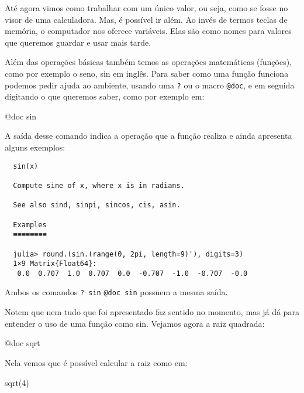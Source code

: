 \documentclass[
  letterpaper,
  DIV=11,
  numbers=noendperiod]{scrreprt}
\newenvironment{Shaded}{\begin{snugshade}}{\end{snugshade}}
\newcommand{\FloatTok}[1]{\textcolor[rgb]{0.68,0.00,0.00}{#1}}
\newcommand{\FunctionTok}[1]{\textcolor[rgb]{0.28,0.35,0.67}{#1}}
\newcommand{\NormalTok}[1]{\textcolor[rgb]{0.00,0.23,0.31}{#1}}
\newcommand{\PreprocessorTok}[1]{\textcolor[rgb]{0.68,0.00,0.00}{#1}}
\begin{document}
Até agora vimos como trabalhar com um único valor, ou seja, como se
fosse no visor de uma calculadora. Mas, é possível ir além. Ao invés de
termos teclas de memória, o computador nos oferece variáveis. Elas são
como nomes para valores que queremos guardar e usar mais tarde.

Além das operações básicas também temos as operações matemáticas
(funções), como por exemplo o seno, sin em inglês. Para saber como uma
função funciona podemos pedir ajuda ao ambiente, usando uma \texttt{?}
ou o macro \texttt{@doc}, e em seguida digitando o que queremos saber,
como por exemplo em:

\begin{Shaded}
\begin{Highlighting}[]
\PreprocessorTok{@doc}\NormalTok{ sin}
\end{Highlighting}
\end{Shaded}

A saída desse comando indica a operação que a função realiza e ainda
apresenta alguns exemplos:

\begin{verbatim}
  sin(x)

  Compute sine of x, where x is in radians.

  See also sind, sinpi, sincos, cis, asin.

  Examples
  ≡≡≡≡≡≡≡≡

  julia> round.(sin.(range(0, 2pi, length=9)'), digits=3)
  1×9 Matrix{Float64}:
   0.0  0.707  1.0  0.707  0.0  -0.707  -1.0  -0.707  -0.0
\end{verbatim}

Ambos os comandos \texttt{?\ sin} \texttt{@doc\ sin} possuem a mesma
saída.

Notem que nem tudo que foi apresentado faz sentido no momento, mas já dá
para entender o uso de uma função como sin. Vejamos agora a raiz
quadrada:

\begin{Shaded}
\begin{Highlighting}[]
\PreprocessorTok{@doc}\NormalTok{ sqrt}
\end{Highlighting}
\end{Shaded}

Nela vemos que é possível calcular a raiz como em:

\begin{Shaded}
\begin{Highlighting}[]
\FunctionTok{sqrt}\NormalTok{(}\FloatTok{4}\NormalTok{)}
\end{Highlighting}
\end{Shaded}
\end{document}
